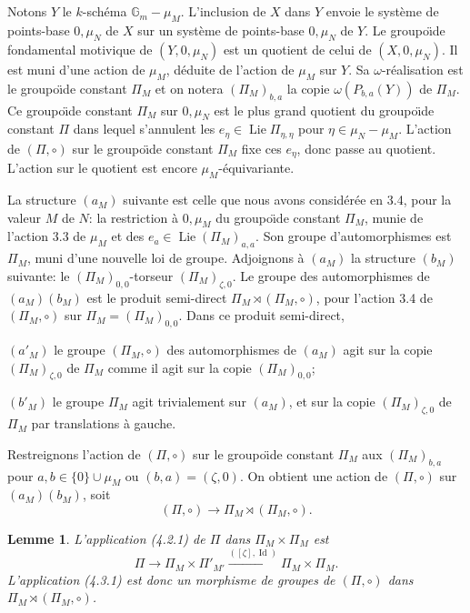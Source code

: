 \documentclass[11pt,a4paper]{article}
\theoremstyle{plain}
\newtheorem{lemma}[theorem]{Lemme}
\theoremstyle{definition}
\DeclareMathOperator{\Lie}{Lie}
\DeclareMathOperator{\Id}{Id}
\newcommand{\Gm}{\mathbb{G}_m}
\begin{document}
\subsection{}
Notons $Y$ le $k$-sch\'ema $\Gm - \mu_M$. L'inclusion de $X$ dans $Y$ envoie le syst\`eme de points-base $0, \mu_N$ de $X$ sur un syst\`eme de points-base $0, \mu_N$ de $Y$. Le groupo\"{\i}de fondamental motivique de $(Y, 0, \mu_N)$ est un quotient de celui de $(X, 0, \mu_N)$. Il est muni d'une action de $\mu_M$, d\'eduite de l'action de $\mu_M$ sur $Y$. Sa $\omega$-r\'ealisation est le groupo\"{\i}de constant $\Pi_M$ et on notera $(\Pi_M)_{b,a}$ la copie $\omega(P_{b,a}(Y))$ de $\Pi_M$. Ce groupo\"{\i}de constant $\Pi_M$ sur $0, \mu_N$ est le plus grand quotient du groupo\"{\i}de constant $\Pi$ dans lequel s'annulent les $e_\eta \in \Lie \Pi_{\eta,\eta}$ pour $\eta \in \mu_N - \mu_M$. L'action de $(\Pi, \circ)$ sur le groupo\"{\i}de constant $\Pi_M$ fixe ces $e_\eta$, donc passe au quotient. L'action sur le quotient est encore $\mu_M$-\'equivariante.

La structure $(a_M)$ suivante est celle que nous avons consid\'er\'ee en 3.4, pour la valeur $M$ de $N$: la restriction \`a $0, \mu_M$ du groupo\"{\i}de constant $\Pi_M$, munie de l'action 3.3 de $\mu_M$ et des $e_a \in \Lie(\Pi_M)_{a,a}$. Son groupe d'automorphismes est $\Pi_M$, muni d'une nouvelle loi de groupe.
Adjoignons \`a $(a_M)$ la structure $(b_M)$ suivante: le $(\Pi_M)_{0,0}$-torseur $(\Pi_M)_{\zeta,0}$. Le groupe des automorphismes de $(a_M)(b_M)$ est le produit semi-direct $\Pi_M \rtimes (\Pi_M, \circ)$, pour l'action 3.4 de $(\Pi_M, \circ)$ sur $\Pi_M = (\Pi_M)_{0,0}$. Dans ce produit semi-direct,

$(a'_{M})$ le groupe $(\Pi_M, \circ)$ des automorphismes de $(a_M)$ agit sur la copie $(\Pi_M)_{\zeta,0}$ de $\Pi_M$ comme il agit sur la copie $(\Pi_M)_{0,0}$;

$(b'_{M})$ le groupe $\Pi_M$ agit trivialement sur $(a_M)$, et sur la copie $(\Pi_M)_{\zeta,0}$ de $\Pi_M$ par translations \`a gauche.

Restreignons l'action de $(\Pi, \circ)$ sur le groupo\"{\i}de constant $\Pi_M$ aux $(\Pi_M)_{b,a}$ pour $a,b \in \{0\} \cup \mu_M$ ou $(b,a) = (\zeta, 0)$. On obtient une action de $(\Pi, \circ)$ sur $(a_M)(b_M)$, soit
\begin{equation}\label{eq:4.2.1}
(\Pi, \circ) \to \Pi_M \rtimes (\Pi_M, \circ).
\end{equation}

\begin{lemma}\label{lem:4.3}
L'application (4.2.1) de $\Pi$ dans $\Pi_M \times \Pi_{M}$ est
\begin{equation}\label{eq:4.3.1}
\Pi \to \Pi_M \times \Pi'_{M'} \xrightarrow{([\zeta], \Id)} \Pi_M \times \Pi_M.
\end{equation}
L'application (4.3.1) est donc un morphisme de groupes de $(\Pi, \circ)$ dans $\Pi_M \rtimes (\Pi_M, \circ)$.
\end{lemma}
\end{document}
